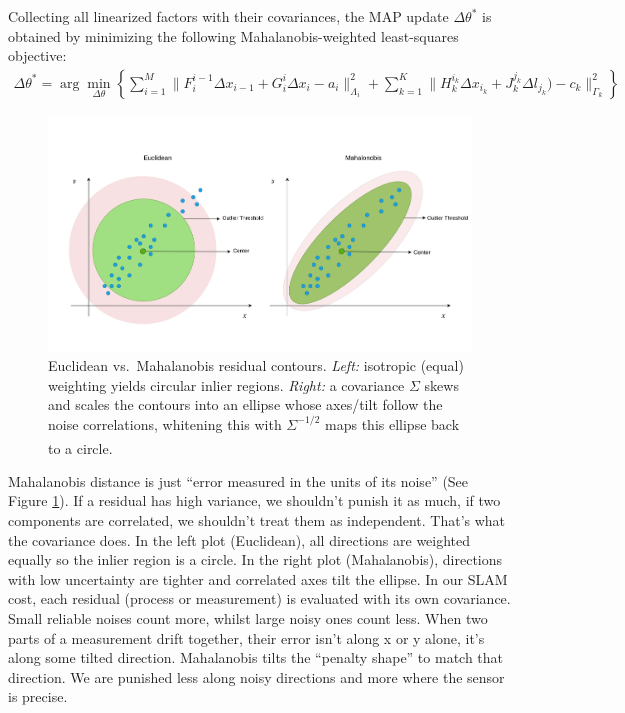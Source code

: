 \\ \\
Collecting all linearized factors with their covariances, the \gls{MAP} update $\Delta\theta^{*}$ is obtained by minimizing the following Mahalanobis-weighted least-squares objective:
\begin{equation}
    \begin{aligned}
        \Delta\theta^{*} = 
        \arg\min_{\Delta\theta}\left\{ 
            \sum_{i=1}^{M}{\|F_{i}^{i-1}\Delta x_{i-1} + G_{i}^{i}\Delta x_{i} - a_i\|_{\Lambda_i}^{2}} +
            \sum_{k=1}^{K}{\|H_{k}^{i_k}\Delta x_{i_k} + J_{k}^{j_k} \Delta l_{j_k}) - c_k\|_{\Gamma_k}^{2}}
            \right\}
    \end{aligned}
    \label{eq:optimizer-iSAM-delta-theta-star-mahalanobis-form}
\end{equation}
\begin{figure}[H]
    \centering
    \includegraphics[width=0.9\linewidth]{Pictures/Optimizers/iSAM/Mahalanobis_Distance.png}
    \caption{Euclidean vs.\ Mahalanobis residual contours. \textit{Left:} isotropic (equal) weighting yields circular inlier regions. \textit{Right:} a covariance $\Sigma$ skews and scales the contours into an ellipse whose axes/tilt follow the noise correlations, whitening this with $\Sigma^{-1/2}$ maps this ellipse back to a circle.\textsuperscript{\cite{mahalanobis_distance_explained}}}
    \label{fig:mahalanobis-distance}
\end{figure}
\noindent
Mahalanobis distance is just ``error measured in the units of its noise'' (See Figure \ref{fig:mahalanobis-distance}). If a residual has high variance, we shouldn't punish it as much, if two components are correlated, we shouldn't treat them as independent. That's what the covariance does. In the left plot (Euclidean), all directions are weighted equally so the inlier region is a circle. In the right plot (Mahalanobis), directions with low uncertainty are tighter and correlated axes tilt the ellipse. In our \gls{SLAM} cost, each residual (process or measurement) is evaluated with its own covariance. Small reliable noises count more, whilst large noisy ones count less. When two parts of a measurement drift together, their error isn't along x or y alone, it's along some tilted direction. Mahalanobis tilts the ``penalty shape'' to match that direction. We are punished less along noisy directions and more where the sensor is precise.
